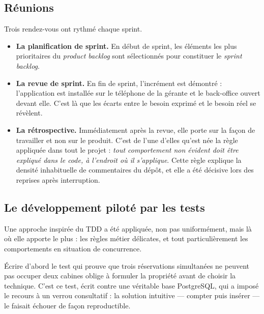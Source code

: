 \subsection{Réunions}

Trois rendez-vous ont rythmé chaque sprint.

\begin{itemize}[leftmargin=1.2cm]
  \item \textbf{La planification de sprint.} En début de sprint, les éléments
  les plus prioritaires du \textit{product backlog} sont sélectionnés pour
  constituer le \textit{sprint backlog}.

  \item \textbf{La revue de sprint.} En fin de sprint, l'incrément est
  démontré : l'application est installée sur le téléphone de la gérante et le
  back-office ouvert devant elle. C'est là que les écarts entre le besoin
  exprimé et le besoin réel se révèlent.

  \item \textbf{La rétrospective.} Immédiatement après la revue, elle porte sur
  la façon de travailler et non sur le produit. C'est de l'une d'elles qu'est
  née la règle appliquée dans tout le projet : \emph{tout comportement non
  évident doit être expliqué dans le code, à l'endroit où il s'applique}. Cette
  règle explique la densité inhabituelle de commentaires du dépôt, et elle a
  été décisive lors des reprises après interruption.
\end{itemize}

\subsection{Le développement piloté par les tests}

Une approche inspirée du TDD a été appliquée, non pas uniformément, mais là où
elle apporte le plus : les règles métier délicates, et tout particulièrement
les comportements en situation de concurrence.

Écrire d'abord le test qui prouve que trois réservations simultanées ne peuvent
pas occuper deux cabines oblige à formuler la propriété avant de choisir la
technique. C'est ce test, écrit contre une véritable base PostgreSQL, qui a
imposé le recours à un verrou consultatif : la solution intuitive --- compter
puis insérer --- le faisait échouer de façon reproductible.


